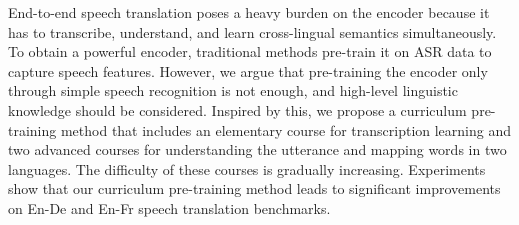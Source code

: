End-to-end speech translation poses a heavy burden on the encoder because it has to transcribe, understand, and learn cross-lingual semantics simultaneously. To obtain a powerful encoder, traditional methods pre-train it on ASR data to capture speech features. However, we argue that pre-training the encoder only through simple speech recognition is not enough, and high-level linguistic knowledge should be considered. Inspired by this, we propose a curriculum pre-training method that includes an elementary course for transcription learning and two advanced courses for understanding the utterance and mapping words in two languages. The difficulty of these courses is gradually increasing. Experiments show that our curriculum pre-training method leads to significant improvements on En-De and En-Fr speech translation benchmarks.
